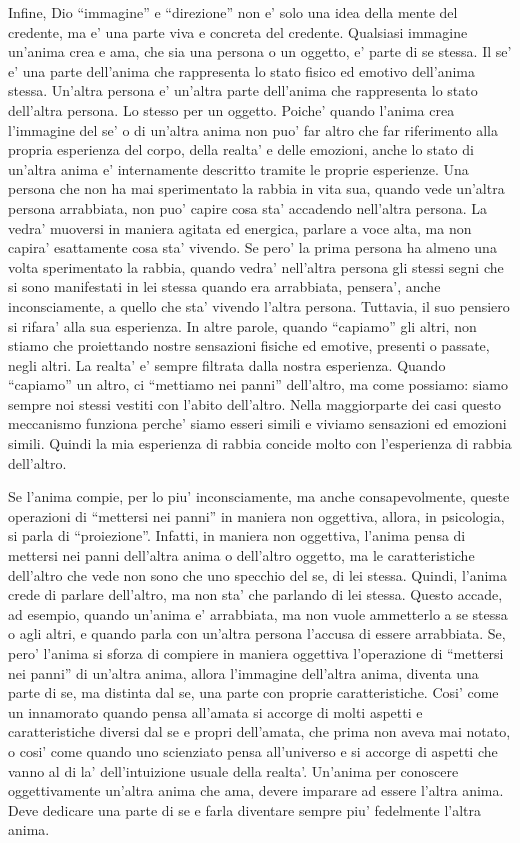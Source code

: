 Infine, Dio ``immagine'' e ``direzione'' non e' solo una idea della mente del credente, ma e' una parte viva e concreta del credente. Qualsiasi immagine un'anima crea e ama, che sia una persona o un oggetto, e' parte di se stessa. Il se' e' una parte dell'anima che rappresenta lo stato fisico ed emotivo dell'anima stessa. Un'altra persona e' un'altra parte dell'anima che rappresenta lo stato dell'altra persona. Lo stesso per un oggetto. Poiche' quando l'anima crea l'immagine del se' o di un'altra anima non puo' far altro che far riferimento alla propria esperienza del corpo, della realta' e delle emozioni, anche lo stato di un'altra anima e' internamente descritto tramite le proprie esperienze. Una persona che non ha mai sperimentato la rabbia in vita sua, quando vede un'altra persona arrabbiata, non puo' capire cosa sta' accadendo nell'altra persona. La vedra' muoversi in maniera agitata ed energica, parlare a voce alta, ma non capira' esattamente cosa sta' vivendo. Se pero' la prima persona ha almeno una volta sperimentato la rabbia, quando vedra' nell'altra persona gli stessi segni che si sono manifestati in lei stessa quando era arrabbiata, pensera', anche inconsciamente, a quello che sta' vivendo l'altra persona. Tuttavia, il suo pensiero si rifara' alla sua esperienza. In altre parole, quando ``capiamo'' gli altri, non stiamo che proiettando nostre sensazioni fisiche ed emotive, presenti o passate, negli altri. La realta' e' sempre filtrata dalla nostra esperienza. Quando ``capiamo'' un altro, ci ``mettiamo nei panni'' dell'altro, ma come possiamo: siamo sempre noi stessi vestiti con l'abito dell'altro. Nella maggiorparte dei casi questo meccanismo funziona perche' siamo esseri simili e viviamo sensazioni ed emozioni simili. Quindi la mia esperienza di rabbia concide molto con l'esperienza di rabbia dell'altro.

Se l'anima compie, per lo piu' inconsciamente, ma anche consapevolmente, queste operazioni di ``mettersi nei panni'' in maniera non oggettiva, allora, in psicologia, si parla di ``proiezione''. Infatti, in maniera non oggettiva, l'anima pensa di mettersi nei panni dell'altra anima o dell'altro oggetto, ma le caratteristiche dell'altro che vede non sono che uno specchio del se, di lei stessa. Quindi, l'anima crede di parlare dell'altro, ma non sta' che parlando di lei stessa. Questo accade, ad esempio, quando un'anima e' arrabbiata, ma non vuole ammetterlo a se stessa o agli altri, e quando parla con un'altra persona l'accusa di essere arrabbiata.
Se, pero' l'anima si sforza di compiere in maniera oggettiva l'operazione di ``mettersi nei panni'' di un'altra anima, allora l'immagine dell'altra anima, diventa una parte di se, ma distinta dal se, una parte con proprie caratteristiche. Cosi' come un innamorato quando pensa all'amata si accorge di molti aspetti e caratteristiche diversi dal se e propri dell'amata, che prima non aveva mai notato, o cosi' come quando uno scienziato pensa all'universo e si accorge di aspetti che vanno al di la' dell'intuizione usuale della realta'. Un'anima per conoscere oggettivamente un'altra anima che ama, devere imparare ad essere l'altra anima. Deve dedicare una parte di se e farla diventare sempre piu' fedelmente l'altra anima.

